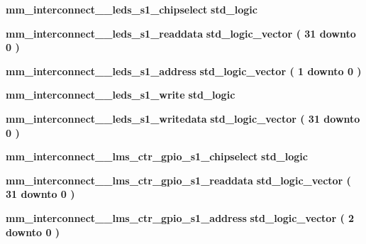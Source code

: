 \begin{DoxyCompactItemize}
\item 
{\bf mm\+\_\+interconnect\+\_\+\_\+leds\+\_\+s1\+\_\+chipselect} {\bfseries \textcolor{comment}{std\+\_\+logic}\textcolor{vhdlchar}{ }} 
\item 
{\bf mm\+\_\+interconnect\+\_\+\_\+leds\+\_\+s1\+\_\+readdata} {\bfseries \textcolor{comment}{std\+\_\+logic\+\_\+vector}\textcolor{vhdlchar}{ }\textcolor{vhdlchar}{(}\textcolor{vhdlchar}{ }\textcolor{vhdlchar}{ } \textcolor{vhdldigit}{31} \textcolor{vhdlchar}{ }\textcolor{keywordflow}{downto}\textcolor{vhdlchar}{ }\textcolor{vhdlchar}{ } \textcolor{vhdldigit}{0} \textcolor{vhdlchar}{ }\textcolor{vhdlchar}{)}\textcolor{vhdlchar}{ }} 
\item 
{\bf mm\+\_\+interconnect\+\_\+\_\+leds\+\_\+s1\+\_\+address} {\bfseries \textcolor{comment}{std\+\_\+logic\+\_\+vector}\textcolor{vhdlchar}{ }\textcolor{vhdlchar}{(}\textcolor{vhdlchar}{ }\textcolor{vhdlchar}{ } \textcolor{vhdldigit}{1} \textcolor{vhdlchar}{ }\textcolor{keywordflow}{downto}\textcolor{vhdlchar}{ }\textcolor{vhdlchar}{ } \textcolor{vhdldigit}{0} \textcolor{vhdlchar}{ }\textcolor{vhdlchar}{)}\textcolor{vhdlchar}{ }} 
\item 
{\bf mm\+\_\+interconnect\+\_\+\_\+leds\+\_\+s1\+\_\+write} {\bfseries \textcolor{comment}{std\+\_\+logic}\textcolor{vhdlchar}{ }} 
\item 
{\bf mm\+\_\+interconnect\+\_\+\_\+leds\+\_\+s1\+\_\+writedata} {\bfseries \textcolor{comment}{std\+\_\+logic\+\_\+vector}\textcolor{vhdlchar}{ }\textcolor{vhdlchar}{(}\textcolor{vhdlchar}{ }\textcolor{vhdlchar}{ } \textcolor{vhdldigit}{31} \textcolor{vhdlchar}{ }\textcolor{keywordflow}{downto}\textcolor{vhdlchar}{ }\textcolor{vhdlchar}{ } \textcolor{vhdldigit}{0} \textcolor{vhdlchar}{ }\textcolor{vhdlchar}{)}\textcolor{vhdlchar}{ }} 
\item 
{\bf mm\+\_\+interconnect\+\_\+\_\+lms\+\_\+ctr\+\_\+gpio\+\_\+s1\+\_\+chipselect} {\bfseries \textcolor{comment}{std\+\_\+logic}\textcolor{vhdlchar}{ }} 
\item 
{\bf mm\+\_\+interconnect\+\_\+\_\+lms\+\_\+ctr\+\_\+gpio\+\_\+s1\+\_\+readdata} {\bfseries \textcolor{comment}{std\+\_\+logic\+\_\+vector}\textcolor{vhdlchar}{ }\textcolor{vhdlchar}{(}\textcolor{vhdlchar}{ }\textcolor{vhdlchar}{ } \textcolor{vhdldigit}{31} \textcolor{vhdlchar}{ }\textcolor{keywordflow}{downto}\textcolor{vhdlchar}{ }\textcolor{vhdlchar}{ } \textcolor{vhdldigit}{0} \textcolor{vhdlchar}{ }\textcolor{vhdlchar}{)}\textcolor{vhdlchar}{ }} 
\item 
{\bf mm\+\_\+interconnect\+\_\+\_\+lms\+\_\+ctr\+\_\+gpio\+\_\+s1\+\_\+address} {\bfseries \textcolor{comment}{std\+\_\+logic\+\_\+vector}\textcolor{vhdlchar}{ }\textcolor{vhdlchar}{(}\textcolor{vhdlchar}{ }\textcolor{vhdlchar}{ } \textcolor{vhdldigit}{2} \textcolor{vhdlchar}{ }\textcolor{keywordflow}{downto}\textcolor{vhdlchar}{ }\textcolor{vhdlchar}{ } \textcolor{vhdldigit}{0} \textcolor{vhdlchar}{ }\textcolor{vhdlchar}{)}\textcolor{vhdlchar}{ }} 

\end{DoxyCompactItemize}
